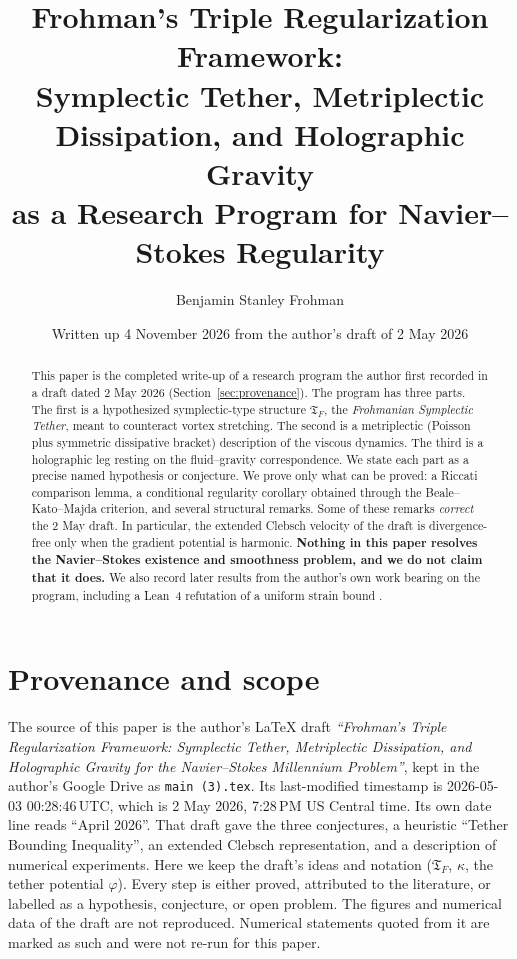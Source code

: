 \documentclass[11pt]{amsart}
\title[Frohman's Triple Regularization Framework]{Frohman's Triple Regularization Framework:\\ Symplectic Tether, Metriplectic Dissipation, and Holographic Gravity\\ as a Research Program for Navier--Stokes Regularity}
\author{Benjamin Stanley Frohman}
\date{Written up 4 November 2026 from the author's draft of 2 May 2026}
\theoremstyle{definition}
\theoremstyle{remark}
\newcommand{\TF}{\mathfrak{T}_F}
\begin{document}
\begin{abstract}
This paper is the completed write-up of a research program the author first recorded in a draft dated 2 May 2026 (Section~\ref{sec:provenance}). The program has three parts. The first is a hypothesized symplectic-type structure $\TF$, the \emph{Frohmanian Symplectic Tether}, meant to counteract vortex stretching. The second is a metriplectic (Poisson plus symmetric dissipative bracket) description of the viscous dynamics. The third is a holographic leg resting on the fluid--gravity correspondence. We state each part as a precise named hypothesis or conjecture. We prove only what can be proved: a Riccati comparison lemma, a conditional regularity corollary obtained through the Beale--Kato--Majda criterion, and several structural remarks. Some of these remarks \emph{correct} the 2 May draft. In particular, the extended Clebsch velocity of the draft is divergence-free only when the gradient potential is harmonic. \textbf{Nothing in this paper resolves the Navier--Stokes existence and smoothness problem, and we do not claim that it does.} We also record later results from the author's own work bearing on the program, including a Lean~4 refutation of a uniform strain bound \cite{FrohmanStrain}.
\end{abstract}
\maketitle

\section{Provenance and scope}\label{sec:provenance}
The source of this paper is the author's \LaTeX{} draft \emph{``Frohman's Triple Regularization Framework: Symplectic Tether, Metriplectic Dissipation, and Holographic Gravity for the Navier--Stokes Millennium Problem''}, kept in the author's Google Drive as \texttt{main (3).tex}. Its last-modified timestamp is 2026-05-03 00:28:46\,UTC, which is 2 May 2026, 7:28\,PM US Central time. Its own date line reads ``April 2026''. That draft gave the three conjectures, a heuristic ``Tether Bounding Inequality'', an extended Clebsch representation, and a description of numerical experiments. Here we keep the draft's ideas and notation ($\TF$, $\kappa$, the tether potential $\varphi$). Every step is either proved, attributed to the literature, or labelled as a hypothesis, conjecture, or open problem. The figures and numerical data of the draft are not reproduced. Numerical statements quoted from it are marked as such and were not re-run for this paper.
\end{document}
